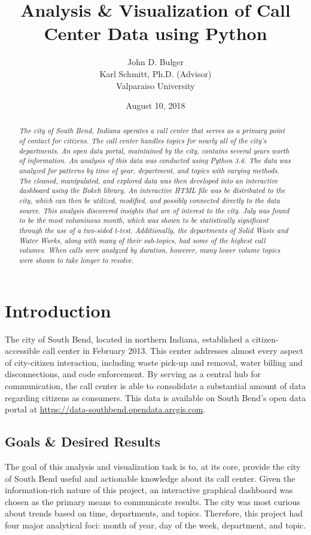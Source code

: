 \documentclass{article}
\title{Analysis \& Visualization of Call Center Data using Python}
\author{John D. Bulger
\\
Karl Schmitt, Ph.D. (Advisor)
\\
Valparaiso University\\
}
\date{August 10, 2018}
\begin{document}
\maketitle

\begin{abstract}
\textit{The city of South Bend, Indiana operates a call center that serves as a primary point of contact for citizens.  The call center handles topics for nearly all of the city's departments.  An open data portal, maintained by the city, contains several years worth of information.  An analysis of this data was conducted using Python 3.6.  The data was 
analyzed for patterns by time of year, department, and topics with varying methods.  The cleaned, manipulated, and explored data was then developed into an 
interactive dashboard using the Bokeh library.  An interactive HTML file was be distributed to the city, which can then be utilized, modified, and possibly connected 
directly to the data source.  This analysis discovered insights that are of interest to the city.  July was found to be the most voluminous month, which was shown to be statistically significant through the use of a two-sided t-test.  Additionally, the departments of Solid Waste and Water Works, along with many of their sub-topics, had some of the highest call volumes.  When calls were analyzed by duration, however, many lower volume topics were shown to take longer to resolve.}
\end{abstract}

\section{Introduction}
The city of South Bend, located in northern Indiana, established a citizen-accessible call center in February 2013.  This center addresses almost every aspect of city-citizen interaction, including waste pick-up and removal, water billing and disconnections, 
and code enforcement.  By serving as a central hub for communication, the call center is able to consolidate a substantial amount of data regarding citizens as consumers.  This data is available on South Bend's open data portal at \href{https://data-southbend.opendata.arcgis.com}{https://data-southbend.opendata.arcgis.com}.

	\subsection{Goals \& Desired Results}

The goal of this analysis and visualization task is to, at its core, provide the city of South Bend useful and actionable knowledge about its call center.  Given the information-rich nature of this project, an interactive graphical dashboard was chosen as the primary means to communicate results.  The city was most curious about trends based on time, departments, and topics.  Therefore, this project had four major analytical foci:  month of year, day of the week, department, and topic.
\end{document}
